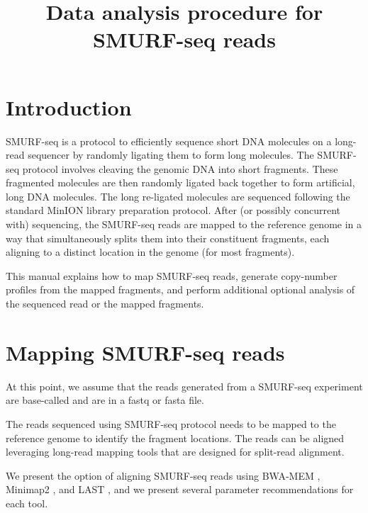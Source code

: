 \documentclass[11pt]{article}
\title{Data analysis procedure for SMURF-seq reads}
\date{}
\begin{document}
\maketitle
\tableofcontents

\newpage
\section{Introduction}
SMURF-seq is a protocol to efficiently sequence short DNA molecules on
a long-read sequencer by randomly ligating them to form
long molecules.
%
The SMURF-seq protocol involves cleaving the genomic DNA into short
fragments. These fragmented molecules are then randomly ligated back
together to form artificial, long DNA molecules. The long re-ligated
molecules are sequenced following the standard MinION library
preparation protocol. After (or possibly concurrent with) sequencing,
the SMURF-seq reads are mapped to the reference genome in a way that
simultaneously splits them into their constituent fragments, each
aligning to a distinct location in the genome (for most fragments).

%
This manual explains how to map SMURF-seq reads, generate copy-number profiles
from the mapped fragments, and perform additional optional analysis of the
sequenced read or the mapped fragments.



\section{Mapping SMURF-seq reads}
At this point, we assume that the reads generated from a
SMURF-seq experiment are base-called and are in a fastq or
fasta file.

The reads sequenced using SMURF-seq protocol needs to be mapped to the
reference genome to identify the fragment locations. The reads can be
aligned leveraging long-read mapping tools that are designed for split-read
alignment.

We present the option of aligning SMURF-seq reads using BWA-MEM
\cite{li2013aligning}, Minimap2 \cite{li2018minimap2}, and LAST
\cite{kielbasa2011adaptive}, and we present several parameter
recommendations for each tool.
\end{document}
